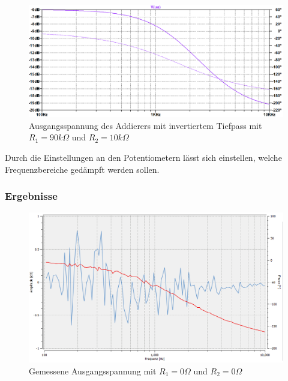\newpage

\begin{figure}[htb]
    \includegraphics[width=16cm]{./pictures/Gesamtschaltung_Invertiert_90_10}
    \caption{Ausgangsspannung des Addierers mit invertiertem Tiefpass mit $R_1 = 90k\Omega$ und $R_2 = 10k\Omega$}
    \label{fig:AddiererAusgangsspannungInvertiert}
\end{figure}

Durch die Einstellungen an den Potentiometern lässt sich einstellen, welche Frequenzbereiche gedämpft werden sollen.

\subsubsection{Ergebnisse}

\begin{figure}[htb]
    \includegraphics[width=16cm]{./pictures/Messungen/Gesamtschaltung_Test_0_0}
    \caption{Gemessene Ausgangsspannung mit $R_1 = 0\Omega$ und $R_2 = 0\Omega$}
    \label{fig:Gesamtschaltung_Test_0_0}
\end{figure}

\newpage

